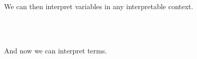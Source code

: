 {\begin{code}%
\> \AgdaSymbol{:}   \<%
\\
\>   \AgdaSymbol{=} \<%
\\
\>  \AgdaInductiveConstructor{::}   \AgdaSymbol{=}       \<%
\end{code}

We can then interpret variables in any interpretable context.

\begin{code}%
\> \AgdaSymbol{:}  \AgdaSymbol{\{} \AgdaSymbol{\}}            \<%
\\
\>   \AgdaSymbol{=} \<%
\\
\>    \AgdaSymbol{=}     \<%
\end{code}

And now we can interpret terms.

}
